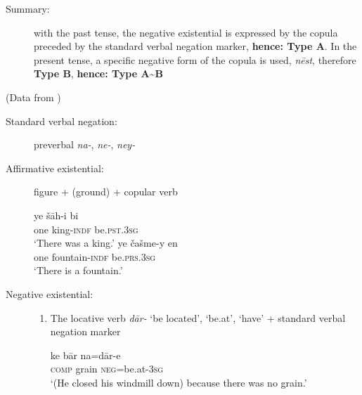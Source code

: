 \documentclass[output=paper,colorlinks,citecolor=brown]{langscibook}
\begin{document}
\begin{paperappendix}
\begin{unindented}
\begin{description}
\item[Summary:] with the past tense, the negative existential is expressed by the copula preceded by the standard verbal negation marker, \textbf{hence: Type A}. In the present tense, a specific negative form of the copula is used, \textit{nēst}, therefore \textbf{Type B}, \textbf{hence: Type A{\textasciitilde}B}
\end{description}

 (Data from \citealt{Lecoq1979})

\begin{description}
\item[Standard verbal negation:] preverbal \textit{na-}, \textit{ne-}, \textit{ney-} 

\item[Affirmative existential:] figure + (ground) + copular verb

\begin{exe}\ex
    \gll ye šāh-i bi \\
one  king-\textsc{indf}    be.\textsc{pst}.\textsc{3sg} \\
    \glt `There was a king.' \citep[107]{Lecoq1979}
\ex \gll ye   čašme-y      en \\
one  fountain-\textsc{indf}   be.\textsc{prs.3sg} \\
    \glt `There is a fountain.' \citep[127]{Lecoq1979}
    \end{exe}

\item[Negative existential:]

\begin{enumerate}
\item The locative verb \textit{dār-} `be located', `be.at', `have' + standard verbal negation marker

\begin{exe}\ex
    \gll ke   bār   na=dār-e \\
\textsc{comp}   grain  \textsc{neg}=be.at-\textsc{3sg} \\
    \glt `(He closed his windmill down) because there was no grain.' \citep[150]{Lecoq1979}
    \end{exe} 


\end{enumerate}
\end{description}
\end{unindented}
\end{paperappendix}
\end{document}
